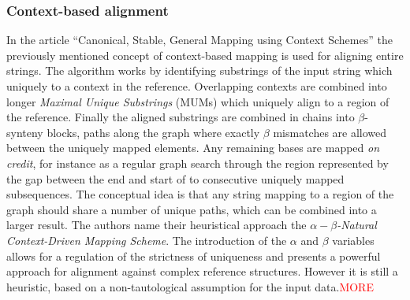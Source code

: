 \documentclass[thesis.tex]{subfiles}
\begin{document}
\subsubsection{Context-based alignment}
\label{sec:canonical}
In the article ``Canonical, Stable, General Mapping using Context Schemes''\cite{canonical_stable_general_mapping_using_context_schemes} the previously mentioned concept of context-based mapping is used for aligning entire strings. The algorithm works by identifying substrings of the input string which  uniquely to a context in the reference. Overlapping contexts are combined into longer \textit{Maximal Unique Substrings} (MUMs) which uniquely align to a region of the reference. Finally the aligned substrings are combined in chains into $\beta$-synteny blocks, paths along the graph where exactly $\beta$ mismatches are allowed between the uniquely mapped elements. Any remaining bases are mapped \textit{on credit}, for instance as a regular graph search through the region represented by the gap between the end and start of to consecutive uniquely mapped subsequences. The conceptual idea is that any string mapping to a region of the graph should share a number of unique paths, which can be combined into a larger result. The authors name their heuristical approach the \textit{$\alpha-\beta$-Natural Context-Driven Mapping Scheme}. The introduction of the $\alpha$ and $\beta$ variables allows for a regulation of the strictness of uniqueness and presents a powerful approach for alignment against complex reference structures. However it is still a heuristic, based on a non-tautological assumption for the input data.\textcolor{red}{MORE}
\end{document}

